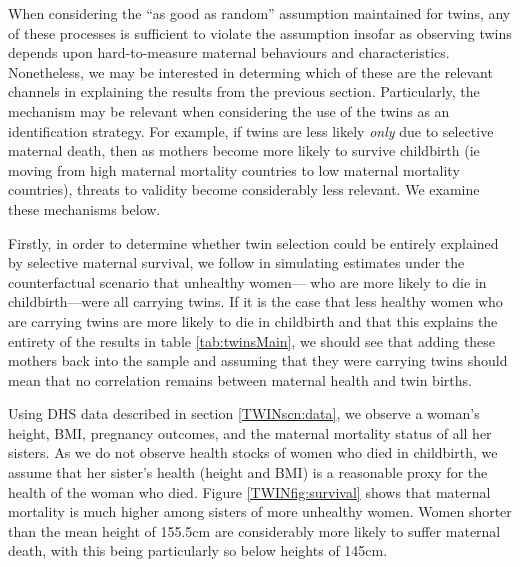 \documentclass[subeqn]{article}
\begin{document}
\begin{spacing}{1.4}
When considering the ``as good as random'' assumption maintained for twins, any
of these processes is sufficient to violate the assumption insofar as observing
twins depends upon hard-to-measure maternal behaviours and characteristics.
Nonetheless, we may be interested in determing which of these are the relevant
channels in explaining the results from the previous section.  Particularly, the
mechanism may be relevant when considering the use of the twins as an
identification strategy.  For example, if twins are less likely \emph{only} due
to selective maternal death, then as mothers become more likely to survive
childbirth (ie moving from high maternal mortality countries to low maternal
mortality countries), threats to validity become considerably less relevant.
We examine these mechanisms below.

Firstly, in order to determine whether twin selection could be entirely
explained by selective maternal survival, we follow \citet{Aldermanetal2011} in
simulating estimates under the counterfactual scenario that unhealthy women---%
who are more likely to die in childbirth---were all carrying twins.  If it is
the case that less healthy women who are carrying twins are more likely to die
in childbirth and that this explains the entirety of the results in table
\ref{tab:twinsMain}, we should see that adding these mothers back into the
sample and assuming that they were carrying twins should mean that no
correlation remains between maternal health and twin births.

Using DHS data described in section \ref{TWINscn:data}, we observe a woman's
height, BMI, pregnancy outcomes, and the maternal mortality status of all her
sisters.  As we do not observe health stocks of women who died in childbirth,
we assume that her sister's health (height and BMI) is a reasonable proxy for
the health of the woman who died.  Figure \ref{TWINfig:survival} shows that
maternal mortality is much higher among sisters of more unhealthy women.
Women shorter than the mean height of 155.5cm are considerably more likely to
suffer maternal death, with this being particularly so below heights of 145cm.


\end{spacing}
\end{document}
